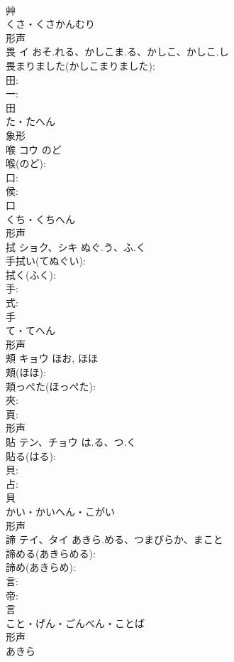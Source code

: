 \documentclass[8pt]{extreport}
\begin{document}
\begin{CJK}{UTF8}{min}
\\	艸	
\\	くさ・くさかんむり	
\\	形声 
\\	畏	イ	おそ.れる、かしこま.る、かしこ、かしこ.し		
\\	畏まりました(かしこまりました): 
\\	田: 
\\	一: 
\\	田	
\\	た・たへん	
\\	象形 
\\	喉	コウ	のど		
\\	喉(のど): 
\\	口: 
\\	侯: 
\\	口	
\\	くち・くちへん	
\\	形声 
\\	拭	ショク、シキ	ぬぐ.う、ふ.く		
\\	手拭い(てぬぐい): 
\\	拭く(ふく): 
\\	手: 
\\	式: 
\\	手	
\\	て・てへん	
\\	形声 
\\	頬	キョウ	ほお, ほほ		
\\	頬(ほほ): 
\\	頬っぺた(ほっぺた): 
\\	夾: 
\\	頁: 
\\	形声 
\\	貼	テン、チョウ	は.る、つ.く		
\\	貼る(はる): 
\\	貝: 
\\	占: 
\\	貝	
\\	かい・かいへん・こがい	
\\	形声 
\\	諦	テイ、タイ	あきら.める、つまびらか、まこと		
\\	諦める(あきらめる): 
\\	諦め(あきらめ): 
\\	言: 
\\	帝: 
\\	言	
\\	こと・げん・ごんべん・ことば	
\\	形声 
\\	あきら 

\end{CJK}
\end{document}
